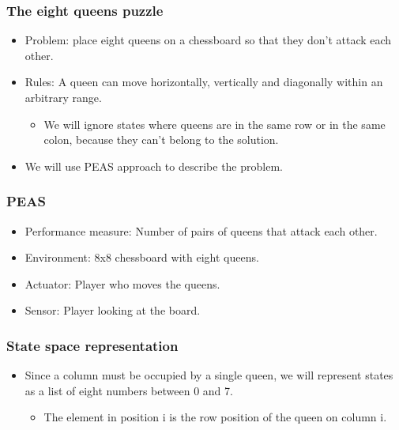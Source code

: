 \documentclass{beamer}
\begin{document}
    \begin{frame}
    \frametitle{The eight queens puzzle}
    \begin{itemize}
        \item Problem: place eight queens on a chessboard so that they don't attack each other.
        \pause
        \item Rules: A queen can move horizontally, vertically and diagonally within an arbitrary range.
        \pause
            \begin{itemize}
                \item We will ignore states where queens are in the same row or in the same colon, because they can't belong to the solution.
            \end{itemize}
        \pause
        \item We will use PEAS approach to describe the problem.
    \end{itemize}
    \end{frame}

    \begin{frame}
    \frametitle{PEAS}
        \begin{itemize}
            \item Performance measure: Number of pairs of queens that attack each other.
            \pause
            \item Environment: 8x8 chessboard with eight queens. 
            \pause
            \item Actuator: Player who moves the queens.
            \pause
            \item Sensor: Player looking at the board.
        \end{itemize}
    \end{frame}

    \begin{frame}
    \frametitle{State space representation}
        \begin{itemize}
            \item Since a column must be occupied by a single queen, we will represent states as a list of eight numbers between 0 and 7.
            \pause
            \begin{itemize}
                \item The element in position i is the row position of the queen on column i.
            \end{itemize}
        \end{itemize}
    \end{frame}
\end{document}

